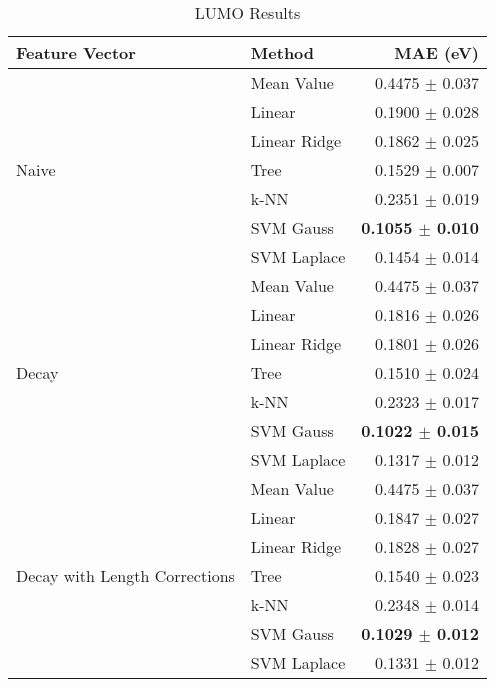 \documentclass[10pt]{article}
\begin{document}
\begin{table}[H]
  \centering
  \caption{LUMO Results}
  \begin{tabular}{llr}
            Feature Vector     & Method       & MAE (eV)                \\
    \hline\hline
    \multirow{7}{*}{Naive}     & Mean Value   & 0.4475 $\pm$ 0.037 \\
                               & Linear       & 0.1900 $\pm$ 0.028 \\
                               & Linear Ridge & 0.1862 $\pm$ 0.025 \\
                               & Tree         & 0.1529 $\pm$ 0.007 \\
                               & k-NN         & 0.2351 $\pm$ 0.019 \\
                               & SVM Gauss    & \textbf{0.1055 $\pm$ 0.010} \\
                               & SVM Laplace  & 0.1454 $\pm$ 0.014 \\
    \hline
    \multirow{7}{*}{Decay}     & Mean Value   & 0.4475 $\pm$ 0.037 \\
                               & Linear       & 0.1816 $\pm$ 0.026 \\
                               & Linear Ridge & 0.1801 $\pm$ 0.026 \\
                               & Tree         & 0.1510 $\pm$ 0.024 \\
                               & k-NN         & 0.2323 $\pm$ 0.017 \\
                               & SVM Gauss    & \textbf{0.1022 $\pm$ 0.015} \\
                               & SVM Laplace  & 0.1317 $\pm$ 0.012 \\
    \hline
    \multirow{7}{*}{Decay with Length Corrections} & Mean Value   & 0.4475 $\pm$ 0.037 \\
                               & Linear       & 0.1847 $\pm$ 0.027 \\
                               & Linear Ridge & 0.1828 $\pm$ 0.027 \\
                               & Tree         & 0.1540 $\pm$ 0.023 \\
                               & k-NN         & 0.2348 $\pm$ 0.014 \\
                               & SVM Gauss    & \textbf{0.1029 $\pm$ 0.012} \\
                               & SVM Laplace  & 0.1331 $\pm$ 0.012 \\

\end{tabular}
\end{table}
\end{document}

